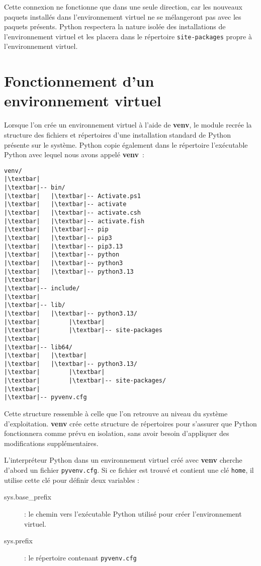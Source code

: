 Cette connexion ne fonctionne que dans une seule direction, car les nouveaux paquets installés dans l'environnement virtuel ne se mélangeront pas avec les paquets présents. Python respectera la nature isolée des installations de l'environnement virtuel et les placera dans le répertoire \texttt{site-packages} propre à l’environnement virtuel.

\section{Fonctionnement d'un environnement virtuel}

Lorsque l'on crée un environnement virtuel à l’aide de \textbf{venv}, le module recrée la structure des fichiers et répertoires d’une installation standard de Python présente sur le système. Python copie également dans le répertoire l’exécutable Python avec lequel nous avons appelé \textbf{venv} :
\begin{lstlisting}[style=tree]
venv/
|\textbar|
|\textbar|-- bin/
|\textbar|   |\textbar|-- Activate.ps1
|\textbar|   |\textbar|-- activate
|\textbar|   |\textbar|-- activate.csh
|\textbar|   |\textbar|-- activate.fish
|\textbar|   |\textbar|-- pip
|\textbar|   |\textbar|-- pip3
|\textbar|   |\textbar|-- pip3.13
|\textbar|   |\textbar|-- python
|\textbar|   |\textbar|-- python3
|\textbar|   |\textbar|-- python3.13
|\textbar|
|\textbar|-- include/
|\textbar|
|\textbar|-- lib/
|\textbar|   |\textbar|-- python3.13/
|\textbar|        |\textbar|
|\textbar|        |\textbar|-- site-packages
|\textbar|
|\textbar|-- lib64/
|\textbar|   |\textbar|
|\textbar|   |\textbar|-- python3.13/
|\textbar|        |\textbar|
|\textbar|        |\textbar|-- site-packages/
|\textbar|
|\textbar|-- pyvenv.cfg
\end{lstlisting}

Cette structure ressemble à celle que l'on retrouve au niveau du système d'exploitation. \textbf{venv} crée cette structure de répertoires pour s’assurer que Python fonctionnera comme prévu en isolation, sans avoir besoin d’appliquer des modifications supplémentaires. 

L'interpréteur Python dans un environnement virtuel créé avec \textbf{venv} cherche d'abord un fichier \texttt{pyvenv.cfg}. Si ce fichier est trouvé et contient une clé \texttt{home}, il utilise cette clé pour définir deux variables :

\begin{description}
    \item[sys.base\_prefix] : le chemin vers l'exécutable Python utilisé pour créer l'environnement virtuel.
    \item[sys.prefix] : le répertoire contenant \texttt{pyvenv.cfg}
\end{description}

